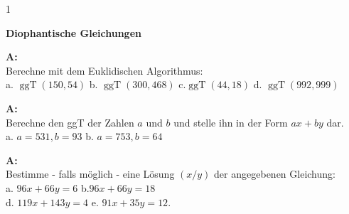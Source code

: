 \documentclass[landscape,twocolumn,a4paper]{article}
\begin{document}
\newcommand{\ggT}{\operatorname{ggT}}
\newcommand{\Mod}[3]{#1\equiv#2\mod#3}
\newcommand\x{1}
\setcounter {y} {1}

\parindent 0mm



\textbf{Diophantische Gleichungen} 
\bigskip

% 
%
%
 
\textbf{A:}   \\
Berechne mit dem Euklidischen Algorithmus: \\
a.  $\ggT(150,54)$ \quad b. $\ggT(300,468)$ \quad 
 c.$\ggT(44,18)$ \quad d. $\ggT(992,999)$
\bigskip {}
 
\textbf{A:}   \\
Berechne den ggT der Zahlen $a$ und $b$ und stelle ihn in der Form $ax + by$ dar. \\
a.   $ a = 531, b = 93$  \quad b. $ a = 753, b = 64$
\bigskip {}

\textbf{A:}   \\
Bestimme - falls möglich - eine Lösung $(x/y)$ der angegebenen Gleichung: \\
a.  $96x+66y=6$ \quad b.$96x+66y=18$ \\
d.  $119x+143y=4$ \quad e. $91x+35y=12$.
\bigskip {}
 
\end{document}
